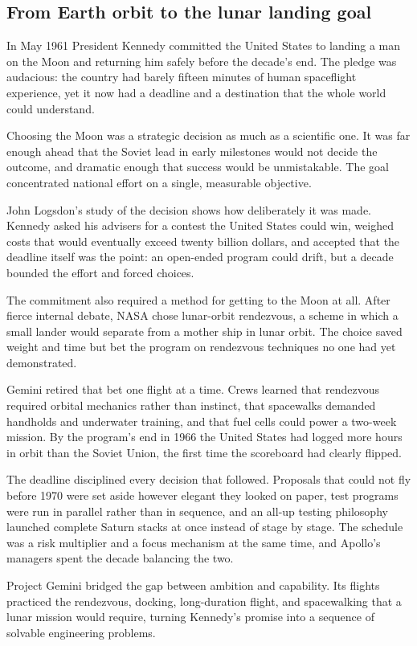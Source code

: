 \subsection{From Earth orbit to the lunar landing goal}
In May 1961 President Kennedy committed the United States to landing a man on the Moon and returning him safely before the decade's end. The pledge was audacious: the country had barely fifteen minutes of human spaceflight experience, yet it now had a deadline and a destination that the whole world could understand.

Choosing the Moon was a strategic decision as much as a scientific one. It was far enough ahead that the Soviet lead in early milestones would not decide the outcome, and dramatic enough that success would be unmistakable. The goal concentrated national effort on a single, measurable objective.

John Logsdon's study of the decision shows how deliberately it was made. Kennedy asked his advisers for a contest the United States could win, weighed costs that would eventually exceed twenty billion dollars, and accepted that the deadline itself was the point: an open-ended program could drift, but a decade bounded the effort and forced choices.

The commitment also required a method for getting to the Moon at all. After fierce internal debate, NASA chose lunar-orbit rendezvous, a scheme in which a small lander would separate from a mother ship in lunar orbit. The choice saved weight and time but bet the program on rendezvous techniques no one had yet demonstrated.

Gemini retired that bet one flight at a time. Crews learned that rendezvous required orbital mechanics rather than instinct, that spacewalks demanded handholds and underwater training, and that fuel cells could power a two-week mission. By the program's end in 1966 the United States had logged more hours in orbit than the Soviet Union, the first time the scoreboard had clearly flipped.

The deadline disciplined every decision that followed. Proposals that could not fly before 1970 were set aside however elegant they looked on paper, test programs were run in parallel rather than in sequence, and an all-up testing philosophy launched complete Saturn stacks at once instead of stage by stage. The schedule was a risk multiplier and a focus mechanism at the same time, and Apollo's managers spent the decade balancing the two.

Project Gemini bridged the gap between ambition and capability. Its flights practiced the rendezvous, docking, long-duration flight, and spacewalking that a lunar mission would require, turning Kennedy's promise into a sequence of solvable engineering problems. \cite{logsdon2010} \cite{cadbury2006}

